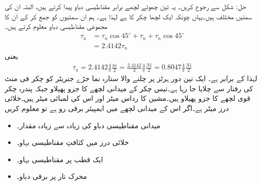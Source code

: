 حل: شکل   سے رجوع کریں۔ یہ تین چھوٹے لچھے برابر مقناطیسی دباو  پیدا کرتے ہیں، البتہ ان کی سمتیں مختلف ہیں۔یہاں چونکہ ایک لچھا   چکر کا ہے لہٰذا  ہے۔ ہم ان سمتیوں کو جمع کر کے ان کا مجموعی مقناطیسی دباو  معلوم کرتے ہیں۔
\begin{align*}
\tau_a&=\tau_n \cos 45^\circ+\tau_n+\tau_n \cos 45^\circ\\
&=2.4142 \tau_n
\end{align*}
یعنی
\begin{align*}
\tau_a=2.4142 \frac{4}{\pi}\frac{ni}{2}=\frac{2.4142}{3} \frac{4}{\pi}\frac{N i}{2}=0.8047 \frac{4}{\pi}\frac{N i}{2}
\end{align*}
لہٰذا  کے برابر ہے۔
%
ایک تین دور  ہرٹز پر چلنے والا ستارہ نما جڑے جنریٹر کو   چکر فی منٹ کی رفتار سے چلایا جا رہا ہے۔تیس چکر کے میدانی لچھے  کا جزو پھیلاو  جبکہ پندرہ چکر قوی لچھے کا جزو پھیلاو  ہیں۔مشین کا رداس  میٹر اور اس  کی لمبائی  میٹر ہیں۔خلائی درز  میٹر ہے۔اگر اس کے میدانی لچھے میں   ایمپیئر برقی رو ہے تو معلوم کریں
\begin{itemize}
\item
میدانی مقناطیسی دباو کی زیادہ سے زیادہ مقدار۔
\item
خلائی درز میں کثافتِ مقناطیسی بہاو۔
\item
ایک قطب پر مقناطیسی بہاو۔
\item
محرک تار پر برقی دباو۔
\end{itemize}

